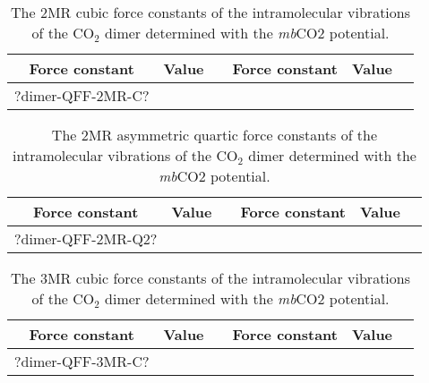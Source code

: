 \documentclass[aip,jcp,showpacs,superscriptaddress,groupedaddress]{revtex4-1}  %
\begin{document}
\begin{table}[H]
\centering
\caption{The 2MR cubic force constants of the intramolecular vibrations of the CO$_2$ dimer determined with the \emph{mb}CO2 potential.}
\label{table:qff_dimer-2mr-t}
\begin{ruledtabular}
\begin{tabular}{cccccc}
Force constant & Value      &  & Force constant & Value      &    \\
\hline \Tstrut
?dimer-QFF-2MR-C?
\end{tabular}
\end{ruledtabular}
\end{table}

\begin{table}[H]
\centering
\caption{The 2MR asymmetric quartic force constants of the intramolecular vibrations of the CO$_2$ dimer determined with the \emph{mb}CO2 potential.}
\label{table:qff_dimer-2mr-q2}
\begin{ruledtabular}
\begin{tabular}{cccccc}
Force constant & Value      &  & Force constant & Value      &    \\
\hline \Tstrut
?dimer-QFF-2MR-Q2?
\end{tabular}
\end{ruledtabular}
\end{table}

\begin{table}[H]
\centering
\caption{The 3MR cubic force constants of the intramolecular vibrations of the CO$_2$ dimer determined with the \emph{mb}CO2 potential.}
\label{table:qff_dimer-3mr-c}
\begin{ruledtabular}
\begin{tabular}{cccccc}
Force constant & Value      &  & Force constant & Value      &    \\
\hline \Tstrut
?dimer-QFF-3MR-C?
\end{tabular}
\end{ruledtabular}
\end{table}
\end{document}
